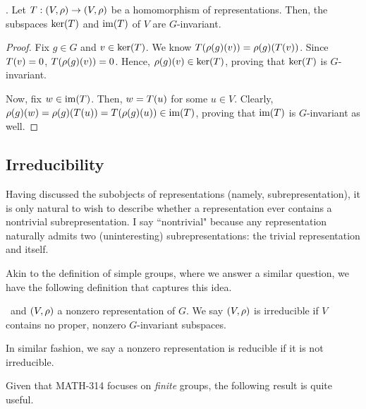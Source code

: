 \begin{proposition}\label{Ch1:Prop:ker_im_subreps}
    . Let $T : \left( V, \rho \right) \to \left( V, \rho \right)$ be a homomorphism of representations. Then, the subspaces $\operatorname{ker}\!\left( T \right)$ and $\operatorname{im}\!\left( T \right)$ of $V$ are $G$-invariant.
\end{proposition}
\begin{proof}
    Fix $g \in G$ and $v \in \operatorname{ker}\!\left( T \right)$. We know $T\!\left( \rho(g)(v) \right) = \rho(g)\!\left( T\!\left( v \right) \right)$. Since $T\!\left( v \right) = 0$, $T\!\left( \rho(g)(v) \right) = 0$. Hence, $\rho(g)(v) \in \operatorname{ker}\!\left( T \right)$, proving that $\operatorname{ker}\!\left( T \right)$ is $G$-invariant.

    Now, fix $w \in \operatorname{im}\!\left( T \right)$. Then, $w = T\!\left( u \right)$ for some $u \in V$. Clearly, $\rho(g)(w) = \rho(g)\!\left( T\!\left( u \right) \right) = T\!\left( \rho(g)(u) \right) \in \operatorname{im}\!\left( T \right)$, proving that $\operatorname{im}\!\left( T \right)$ is $G$-invariant as well.
\end{proof}

\subsection{Irreducibility}

Having discussed the subobjects of representations (namely, subrepresentation), it is only natural to wish to describe whether a representation ever contains a nontrivial subrepresentation. I say ``nontrivial" because any representation naturally admits two (uninteresting) subrepresentations: the trivial representation and itself.

Akin to the definition of simple groups, where we answer a similar question, we have the following definition that captures this idea.

\begin{boxdefinition}[Irreducibility]
    \ and $\left( V, \rho \right)$ a nonzero representation of $G$. We say $\left( V,\rho \right)$ is irreducible if $V$ contains no proper, nonzero $G$-invariant subspaces.
\end{boxdefinition}
In similar fashion, we say a nonzero representation is reducible if it is not irreducible.

Given that MATH-314 focuses on \textit{finite} groups, the following result is quite useful.

